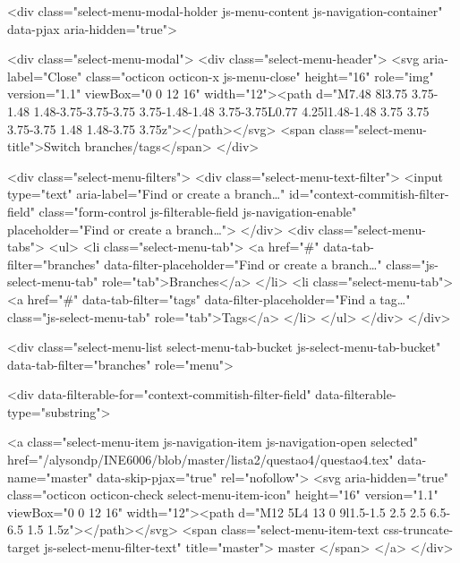   <div class="select-menu-modal-holder js-menu-content js-navigation-container" data-pjax aria-hidden="true">

    <div class="select-menu-modal">
      <div class="select-menu-header">
        <svg aria-label="Close" class="octicon octicon-x js-menu-close" height="16" role="img" version="1.1" viewBox="0 0 12 16" width="12"><path d="M7.48 8l3.75 3.75-1.48 1.48-3.75-3.75-3.75 3.75-1.48-1.48 3.75-3.75L0.77 4.25l1.48-1.48 3.75 3.75 3.75-3.75 1.48 1.48-3.75 3.75z"></path></svg>
        <span class="select-menu-title">Switch branches/tags</span>
      </div>

      <div class="select-menu-filters">
        <div class="select-menu-text-filter">
          <input type="text" aria-label="Find or create a branch…" id="context-commitish-filter-field" class="form-control js-filterable-field js-navigation-enable" placeholder="Find or create a branch…">
        </div>
        <div class="select-menu-tabs">
          <ul>
            <li class="select-menu-tab">
              <a href="#" data-tab-filter="branches" data-filter-placeholder="Find or create a branch…" class="js-select-menu-tab" role="tab">Branches</a>
            </li>
            <li class="select-menu-tab">
              <a href="#" data-tab-filter="tags" data-filter-placeholder="Find a tag…" class="js-select-menu-tab" role="tab">Tags</a>
            </li>
          </ul>
        </div>
      </div>

      <div class="select-menu-list select-menu-tab-bucket js-select-menu-tab-bucket" data-tab-filter="branches" role="menu">

        <div data-filterable-for="context-commitish-filter-field" data-filterable-type="substring">


            <a class="select-menu-item js-navigation-item js-navigation-open selected"
               href="/alysondp/INE6006/blob/master/lista2/questao4/questao4.tex"
               data-name="master"
               data-skip-pjax="true"
               rel="nofollow">
              <svg aria-hidden="true" class="octicon octicon-check select-menu-item-icon" height="16" version="1.1" viewBox="0 0 12 16" width="12"><path d="M12 5L4 13 0 9l1.5-1.5 2.5 2.5 6.5-6.5 1.5 1.5z"></path></svg>
              <span class="select-menu-item-text css-truncate-target js-select-menu-filter-text" title="master">
                master
              </span>
            </a>
        </div>

